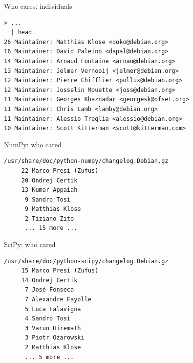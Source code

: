 \documentclass[]{beamer}
\begin{document}
{\begin{frame}[fragile]{Who cares: individuals}
\begin{verbatim}
> ...
  | head
26 Maintainer: Matthias Klose <doko@debian.org>
16 Maintainer: David Paleino <dapal@debian.org>
14 Maintainer: Arnaud Fontaine <arnau@debian.org>
13 Maintainer: Jelmer Vernooij <jelmer@debian.org>
12 Maintainer: Pierre Chifflier <pollux@debian.org>
12 Maintainer: Josselin Mouette <joss@debian.org>
11 Maintainer: Georges Khaznadar <georgesk@ofset.org>
11 Maintainer: Chris Lamb <lamby@debian.org>
11 Maintainer: Alessio Treglia <alessio@debian.org>
10 Maintainer: Scott Kitterman <scott@kitterman.com>
\end{verbatim}
\end{frame}

\begin{frame}[fragile]{NumPy: who cared}
\begin{verbatim}
/usr/share/doc/python-numpy/changelog.Debian.gz
     22 Marco Presi (Zufus)
     20 Ondrej Certik
     13 Kumar Appaiah
      9 Sandro Tosi
      9 Matthias Klose
      2 Tiziano Zito
      ... 15 more ...
\end{verbatim}
\end{frame}

\begin{frame}[fragile]{SciPy: who cared}
\begin{verbatim}
/usr/share/doc/python-scipy/changelog.Debian.gz
     15 Marco Presi (Zufus)
     14 Ondrej Certik
      7 José Fonseca
      7 Alexandre Fayolle
      5 Luca Falavigna
      4 Sandro Tosi
      3 Varun Hiremath
      3 Piotr Ożarowski
      2 Matthias Klose
      ... 5 more ...
\end{verbatim}
\end{frame}


}
\end{document}

